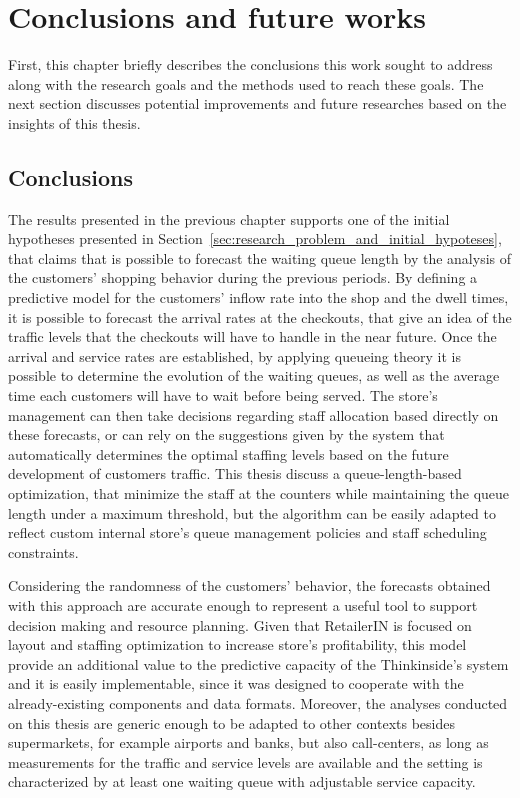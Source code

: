 \chapter{Conclusions and future works}
\label{cha:conclusions_and_future_works}

First, this chapter briefly describes the conclusions this work sought to address along with the research goals and the methods used to reach these goals. The next section discusses potential improvements and future researches based on the insights of this thesis.

\section{Conclusions}
\label{sec:conclusions}

The results presented in the previous chapter supports one of the initial hypotheses presented in Section~\ref{sec:research_problem_and_initial_hypoteses}, that claims that is possible to forecast the waiting queue length by the analysis of the customers’ shopping behavior during the previous periods. By defining a predictive model for the customers’ inflow rate into the shop and the dwell times, it is possible to forecast the arrival rates at the checkouts, that give an idea of the traffic levels that the checkouts will have to handle in the near future. Once the arrival and service rates are established,  by applying queueing theory it is possible to determine the evolution of the waiting queues, as well as the average time each customers will have to wait before being served. The store’s management can then take decisions regarding staff allocation based directly on these forecasts, or can rely on the suggestions given by the system that automatically determines the optimal staffing levels based on the future development of customers traffic. This thesis discuss a queue-length-based optimization, that minimize the staff at the counters while maintaining the queue length under a maximum threshold, but the algorithm can be easily adapted to reflect custom internal store’s queue management policies and staff scheduling constraints.

Considering the randomness of the customers’ behavior, the forecasts obtained with this approach are accurate enough to represent a useful tool to support decision making and resource planning. Given that RetailerIN is focused on layout and staffing optimization to increase store’s profitability, this model provide an additional value to the predictive capacity of the Thinkinside’s system and it is easily implementable, since it was designed to cooperate with the already-existing components and data formats. Moreover, the analyses conducted on this thesis are generic enough to be adapted to other contexts besides supermarkets, for example airports and banks, but also call-centers, as long as measurements for the traffic and service levels are available and the setting is characterized by at least one waiting queue with adjustable service capacity.

